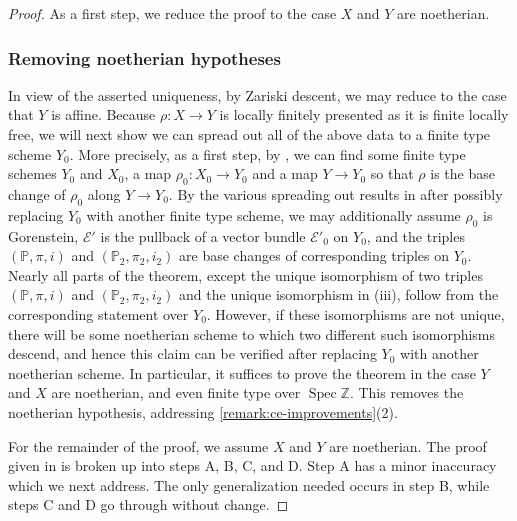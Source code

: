 \documentclass[12 pt]{amsart}
\theoremstyle{plain}
\theoremstyle{definition}
\theoremstyle{remark}
\numberwithin{equation}{section}
\newcommand\bp{\mathbb P}
\newcommand\bz{\mathbb Z}
\newcommand\sce{\mathscr E}
\DeclareMathOperator\spec{\operatorname{Spec}}
\begin{document}
\begin{proof}
As a first step, we reduce the proof to the case $X$ and $Y$ are noetherian. 
\subsubsection*{Removing noetherian hypotheses}
In view of
the asserted uniqueness, by Zariski descent, we may reduce to the case that $Y$
is affine.  
Because $\rho: X \to Y$ is locally finitely presented as it is
finite locally free, we will next show we can spread out all of the above data to a finite type
scheme $Y_0$.
More precisely, as a first step,
by \cite[Prop. 8.9.1]{EGAIV.3},
we can find some finite type
schemes $Y_0$ and $X_0$, a map $\rho_0: X_0 \to Y_0$ and a map $Y \to Y_0$ so that
$\rho$ is the base change of $\rho_0$ along $Y \to Y_0$.
By the various spreading out results in \cite[\S8]{EGAIV.3}
after possibly replacing $Y_0$ with another finite type scheme, we may
additionally assume
$\rho_0$ is Gorenstein, $\sce'$ is the pullback of a
vector bundle $\sce'_0$ on $Y_0$,
and the triples $(\bp, \pi, i)$ and $(\bp_2, \pi_2, i_2)$ are base changes
of corresponding triples on $Y_0$.
Nearly all parts of the theorem, except the unique isomorphism of two triples $(\bp, \pi,
i)$ and $(\bp_2, \pi_2, i_2)$ and the unique isomorphism in (iii),
follow from the corresponding statement over $Y_0$.
However, if these isomorphisms are not unique, there will be some noetherian
scheme to which two different such isomorphisms descend, and hence this claim
can be verified after replacing $Y_0$ with another noetherian scheme.
In particular, it suffices to prove the theorem in the case $Y$ and $X$
are noetherian, and even finite type over $\spec \bz$.
This removes the noetherian hypothesis, addressing
\autoref{remark:ce-improvements}(2).

For the remainder of the proof, we assume $X$ and $Y$ are noetherian.
The proof given in
\cite[Thm.\ 2.1]{casnatiE:covers-algebraic-varieties}
is broken up into steps A, B, C, and D. Step A has a minor inaccuracy
which we next address. The only generalization needed occurs in step B, while
steps C and D go through without change.


\end{proof}
\end{document}
